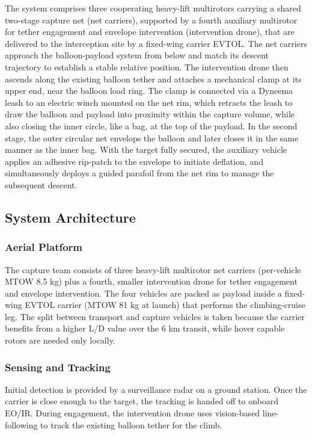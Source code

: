 The system comprises three cooperating heavy-lift multirotors carrying a shared two-stage capture net (net carriers), supported by a fourth auxiliary multirotor for tether engagement and envelope intervention (intervention drone), that are delivered to the interception site by a fixed-wing carrier EVTOL. The net carriers approach the balloon-payload system from below and match its descent trajectory to establish a stable relative position. The intervention drone then ascends along the existing balloon tether and attaches a mechanical clamp at its upper end, near the balloon load ring. The clamp is connected via a Dyneema leash to an electric winch mounted on the net rim, which retracts the leash to draw the balloon and payload into proximity within the capture volume, while also closing the inner circle, like a bag, at the top of the payload. In the second stage, the outer circular net envelops the balloon and later closes it in the same manner as the inner bag. With the target fully secured, the auxiliary vehicle applies an adhesive rip-patch to the envelope to initiate  deflation, and simultaneously deploys a guided parafoil from the net rim to manage the subsequent descent.

\subsection{System Architecture}
\label{subsec:concept_B_architecture}

\subsubsection{Aerial Platform}
The capture team consists of three heavy-lift multirotor net carriers (per-vehicle MTOW 8.5 kg) plus a fourth, smaller intervention drone for tether engagement and envelope intervention. The four vehicles are packed as payload inside a fixed-wing EVTOL carrier (MTOW 81 kg at launch) that performs the climbing-cruise leg. The split between transport and capture vehicles is taken because the carrier benefits from a higher L/D value over the 6 km transit, while hover capable rotors are needed only locally.

\subsubsection{Sensing and Tracking}
Initial detection is provided by a surveillance radar on a ground station. Once the carrier is close enough to the target, the tracking is handed off to onboard EO/IR. During engagement, the intervention drone uses vision-based line-following to track the existing balloon tether for the climb.

